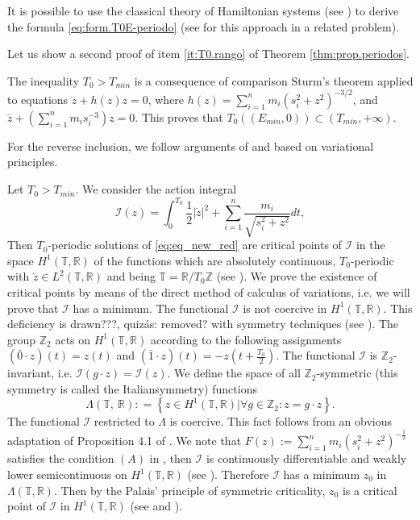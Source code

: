 \documentclass[smallcondensed]{svjour3}
\newcommand{\rr}{\mathbb{R}}
\begin{document}
\begin{remark}
 It is possible to use the classical theory of Hamiltonian systems (see \cite{A}) to derive the formula \eqref{eq:form.T0E-periodo} (see \cite{acinas2014estimates} for this approach in a related problem).
\end{remark}



\begin{remark}
Let us show a second proof of item \ref{it:T0.rango} of Theorem \ref{thm:prop.periodos}.

The inequality $T_0>T_{min}$ is a consequence of comparison Sturm's theorem applied to equations  $\ddot{z}+h(z)z=0$, where $h(z)=\sum_{i=1}^{n} m_i \left(s_i^2 +z^2\right)^{-3/2}$, and $\ddot{z}+\left(\sum_{i=1}^{n} m_i s_i^{-3}\right)z=0$. This proves that $T_0\left((E_{min},0)\right)\subset(T_{min},+\infty)$.

For the reverse inclusion,  we  follow arguments of \cite{zhao2015nonplanar} and \cite{li2013characterization} based on variational principles.


Let $T_0>T_{min}$. We consider the action integral
\[\mathcal{I}(z)=\int_0^{T_0}\frac12|\dot{z}|^2+\sum_{i=1}^n\frac{m_i}{\sqrt{s_i^2+z^2}}dt,\]
Then $T_0$-periodic solutions of \eqref{eq:eq_new_red} are critical points of $\mathcal{I}$ in the space $H^1(\mathbb{T},\rr)$ of the functions which are  absolutely continuous, $T_0$-periodic with $\dot{z}\in L^2(\mathbb{T},\rr)$ and being $\mathbb{T}=\rr/T_0\mathbb{Z}$ (see \cite[Cor. 1.1]{Mawhin2010}). We prove the existence of critical points by means of the direct method of calculus of variations, i.e. we will prove that $\mathcal{I}$ has a minimum.  The functional $\mathcal{I}$ is not coercive in $H^1(\mathbb{T},\rr)$.  This deficiency is \textcolor[rgb]{1,0,0}{drawn???, quiz\'as: removed?} with symmetry techniques (see \cite{David-2004}). The group $\mathbb{Z}_2$ acts on $H^1(\mathbb{T},\rr)$ according to the following assignments $(\bar{0}\cdot z)(t)=z(t)$ and $(\bar{1}\cdot z)(t)=-z(t+\frac{T_0}{2})$. The functional $\mathcal{I}$ is $\mathbb{Z}_2$-invariant, i.e. $\mathcal{I}(g\cdot z)=\mathcal{I}(z)$. We define the space of all $\mathbb{Z}_2$-symmetric (this symmetry is called the Italiansymmetry) functions \[\Lambda(\mathbb{T},\
\mathbb{R}):
=\left\{ z\in H^1(\mathbb{T},\rr) | \forall g\in \mathbb{Z}_2 : z=g\cdot z \right\}.\]
The functional $\mathcal{I}$ restricted to $\Lambda$  is coercive. This fact follows from an obvious adaptation of Proposition 4.1 of \cite{David-2004}. We note that $F(z):=\sum_{i=1}^nm_i(s_i^2+z^2)^{-\frac{1}{2}}$ satisfies the condition $(A)$ in \cite[p. 12]{Mawhin2010}, then $\mathcal{I}$  is continuously differentiable and weakly lower semicontinuous on $H^1(\mathbb{T},\rr)$ (see \cite[p. 13]{Mawhin2010}). Therefore $\mathcal{I}$ has a minimum $z_0$ in $\Lambda(\mathbb{T},\mathbb{R})$. Then by the Palais' principle of symmetric criticality,  $z_0$ is a critical point of $\mathcal{I}$ in $H^1(\mathbb{T},\rr)$ (see \cite{David-2004} and \cite{RichardPalais274}).


\end{remark}
\end{document}
